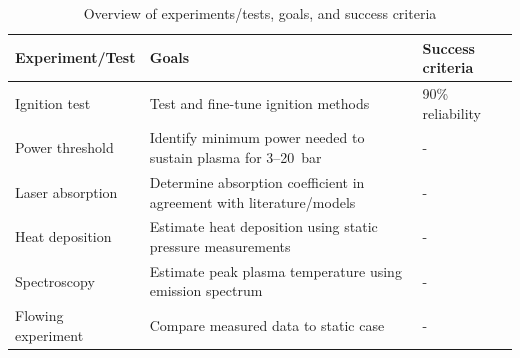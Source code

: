     \begin{table}[h]
        \centering
        \caption{Overview of experiments/tests, goals, and success criteria}
        \label{tab:experiments}
        \renewcommand{\arraystretch}{1.3}
        \begin{tabularx}{\textwidth}{@{}YZY@{}}
            \toprule
            Experiment/Test & Goals & Success criteria \\
            \midrule
            Ignition test & Test and fine-tune ignition methods & 90\% reliability \\
            Power threshold & Identify minimum power needed to sustain plasma for 3--20~bar  & - \\
            Laser absorption & Determine absorption coefficient in agreement with literature/models & - \\
            Heat deposition & Estimate heat deposition using static pressure measurements & - \\
            Spectroscopy & Estimate peak plasma temperature using emission spectrum & - \\
            Flowing experiment & Compare measured data to static case & - \\
            \bottomrule
        \end{tabularx}
    \end{table}

